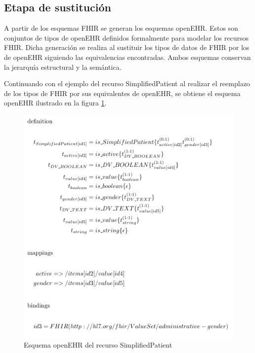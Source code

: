 \subsection{Etapa de sustitución}
A partir de los esquemas FHIR se generan los esquemas openEHR. Estos son conjuntos de tipos de openEHR definidos formalmente para modelar los recursos FHIR. Dicha generación se realiza al sustituir los tipos de datos de FHIR por los de openEHR siguiendo las equivalencias encontradas. Ambos esquemas conservan la jerarquía estructural y la semántica.

Continuando con el ejemplo del recurso SimplifiedPatient al realizar el reemplazo de los tipos de FHIR por sus equivalentes de openEHR, se obtiene el esquema openEHR ilustrado en la figura \ref{fig:substitution}.

\begin{figure}
  \includegraphics[scale=0.5]{./images/substitution}
  \caption{Esquema openEHR del recurso SimplifiedPatient}
  \label{fig:substitution}
\end{figure}
